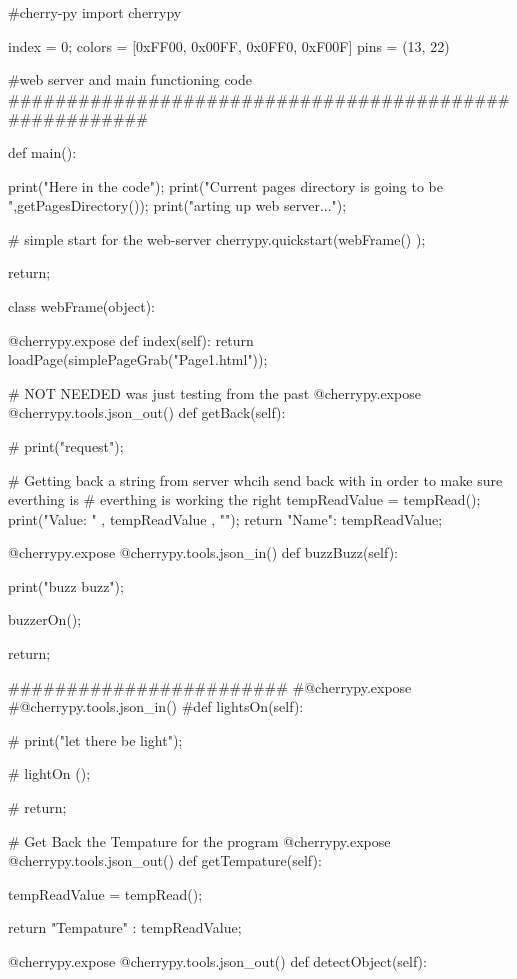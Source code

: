 #cherry-py
import cherrypy



index = 0;
colors = [0xFF00, 0x00FF, 0x0FF0, 0xF00F]
pins = (13, 22)

#web server and main functioning code
#######################################################

def main():
	
	
	
	print("Here in the code");
	print("Current pages directory is going to be ",getPagesDirectory());
	print("\n\nSt arting up web server...");
	
	# simple start for the web-server
	cherrypy.quickstart(webFrame() );
	

	return;

class webFrame(object): 

	

	@cherrypy.expose
	def index(self):
		return loadPage(simplePageGrab("Page1.html"));
	
	
	
	
	# NOT NEEDED was just testing from the past
	@cherrypy.expose
	@cherrypy.tools.json_out()
	def getBack(self):
		
		#
		print("request");
		
		
		# Getting back a string from server whcih send back with in order to make sure everthing is 
		# everthing is working the right
		tempReadValue = tempRead();
		print("\n\nTemp Value: " , tempReadValue , "\n\n");
		return {"Name": tempReadValue};
	
	
	@cherrypy.expose
	@cherrypy.tools.json_in()
	def buzzBuzz(self):
		
		print("buzz buzz");
		
		buzzerOn();
		
		return;
	
	########################	
	#@cherrypy.expose
	#@cherrypy.tools.json_in()
	#def lightsOn(self):
		
	#	print("let there be light");
		
	#	lightOn   ();
		
	#	return;
		
	# Get Back the Tempature for the program
	@cherrypy.expose
	@cherrypy.tools.json_out()
	def getTempature(self): 
		
		tempReadValue = tempRead(); 
		
		
		return {"Tempature" : tempReadValue};
	
	
	
	@cherrypy.expose
	@cherrypy.tools.json_out()
	def detectObject(self):
		
